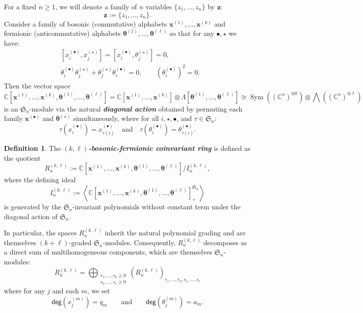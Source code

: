 \documentclass[11pt, noadjust, reqno]{amsart}
\theoremstyle{definition}
\newtheorem{definition}[theorem]{Definition}
\theoremstyle{remark}
\numberwithin{equation}{section}
\newcommand{\0}{\emptyset}
\newcommand{\C}{\mathbb{C}}
\DeclareMathOperator{\Sym}{Sym}
\newcommand{\newword}[1]{\emph{\textbf{#1}}}
\begin{document}
For a fixed $n \geq 1$, we will denote a family of $n$ variables $\{ z_1,\ldots,z_n \}$ by $\bm{z}$:
\[
\bm{z} := \{ z_1,\ldots,z_n \}.
\]
Consider a family of bosonic (commutative) alphabets $\bm{x}^{(1)}, \dots, \bm{x}^{(k)}$ and fermionic (anticommutative) alphabets $\bm{\theta}^{(1)}, \dots, \bm{\theta}^{(\ell)}$
so that for any $\bullet,\star$ we have:
\begin{equation*}
\begin{aligned}
    &[x^{(\bullet)}_i,x^{(\star)}_j]=[x^{(\bullet)}_i,\theta^{(\star)}_j] =0, \\
    &\theta^{(\bullet)}_i\theta^{(\star)}_j + \theta^{(\star)}_j\theta^{(\bullet)}_i =0,  \qquad \left(\theta^{(\bullet)}_i\right)^2 =0.
\end{aligned}
\end{equation*}
Then the vector space
\[
\C[\bm{x}^{(1)}, \ldots, \bm{x}^{(k)}, \bm{\theta}^{(1)}, \ldots, \bm{\theta}^{(\ell)}] = \C[\bm{x}^{(1)}, \ldots, \bm{x}^{(k)}] \otimes \Lambda[\bm{\theta}^{(1)}, \ldots, \bm{\theta}^{(\ell)}]  \cong
   \Sym\left((\C^n)^{\oplus k}\right) \otimes
   {\textstyle\bigwedge}\left((\C^n)^{\oplus \ell}\right) 
\]
is an $\mathfrak{S}_n$-module via the natural \newword{diagonal action} obtained by permuting each family $\bm{x}^{(\bullet)}$ and $\bm{\theta}^{(\star)}$ simultaneously, where for all $i, \star, \bullet$, and $\tau \in \mathfrak{S}_n$: 
\[
\tau(x^{(\bullet)}_i) = x^{(\bullet)}_{\tau(i)} \quad \text{and} \quad \tau(\theta^{(\bullet)}_i) = 
\theta^{(\bullet)}_{\tau(i)}.
\]


\begin{definition}\label{def:bosonic-fermionic}
The \newword{$(k,\ell)$-bosonic-fermionic coinvariant ring} is defined as the quotient
\begin{equation}\label{eq:coinv} R_n^{(k,\ell)} := \C[\bm{x}^{(1)}, \ldots, \bm{x}^{(k)}, \bm{\theta}^{(1)}, \ldots, \bm{\theta}^{(\ell)}]/I_n^{(k,\ell)},\end{equation}
where the defining ideal
\[ I_n^{(k,\ell)}:=\left\langle \C[\bm{x}^{(1)}, \ldots, \bm{x}^{(k)}, \bm{\theta}^{(1)}, \ldots, \bm{\theta}^{(\ell)}]^{\mathfrak{S}_n}_+\right\rangle\]
is generated by the $\mathfrak{S}_n$-invariant polynomials without constant term under the diagonal action of $\mathfrak{S}_n$.
\end{definition}
In particular, the spaces $R_n^{(k,\ell)}$ inherit the natural polynomial grading and are themselves $(k+\ell)$-graded $\mathfrak{S}_n$-modules.
Consequently, $R_n^{(k,\ell)}$ decomposes as a direct sum of multihomogeneous components, which are themselves $\mathfrak{S}_n$-modules:
\begin{equation*}
R_n^{(k,\ell)} = \bigoplus_{\substack{r_1, \dots, r_k \geq 0\\ s_1,\dots,s_\ell \geq 0}} \left(R_n^{(k,\ell)}\right)_{r_1,\dots,r_k, s_1,\dots,s_\ell}
\end{equation*}
where for any $j$ and each $m$, we set
\[
\mathsf{deg}(x^{(m)}_j) = q_m \qquad \text{and} \qquad \mathsf{deg}(\theta^{(m)}_j) = a_m.
\]
\end{document}
